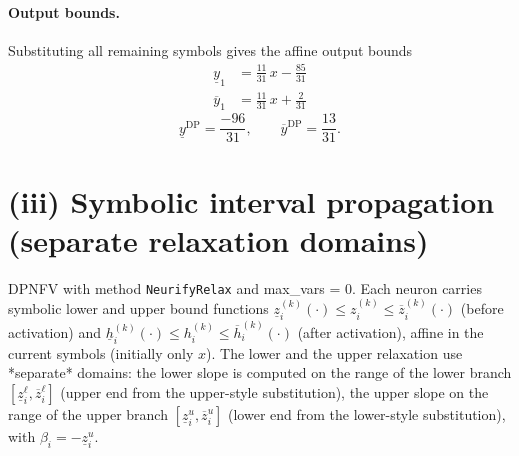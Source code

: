 \documentclass[11pt]{article}
\begin{document}
\paragraph{Output bounds.}
Substituting all remaining symbols gives the affine output bounds
\begin{align*}
\underline{y}_{1} &= \frac{11}{31}\,x - \frac{85}{31}
\end{align*}
\begin{align*}
\overline{y}_{1} &= \frac{11}{31}\,x + \frac{2}{31}
\end{align*}
\begin{equation*}
\underline{y}^{\text{DP}} = \frac{-96}{31}, \qquad \overline{y}^{\text{DP}} = \frac{13}{31}.
\end{equation*}

\section{(iii) Symbolic interval propagation (separate relaxation domains)}
DPNFV with method \texttt{NeurifyRelax} and max\_vars = 0. Each neuron carries symbolic lower and upper bound functions
$\underline{z}^{(k)}_i(\cdot) \le z^{(k)}_i \le \overline{z}^{(k)}_i(\cdot)$ (before activation)
and $\underline{h}^{(k)}_i(\cdot) \le h^{(k)}_i \le \overline{h}^{(k)}_i(\cdot)$ (after activation),
affine in the current symbols (initially only $x$).
The lower and the upper relaxation use *separate* domains:
the lower slope is computed on the range of the lower branch
$[\underline{z}^{\ell}_i, \overline{z}^{\ell}_i]$ (upper end from the upper-style substitution),
the upper slope on the range of the upper branch
$[\underline{z}^{u}_i, \overline{z}^{u}_i]$ (lower end from the lower-style substitution),
with $\beta_i = -\underline{z}^{u}_i$.
\end{document}
